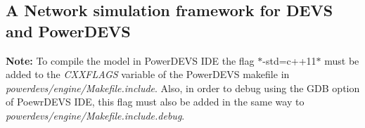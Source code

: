 \subsection*{A Network simulation framework for D\+E\+VS and Power\+D\+E\+VS}

{\bfseries Note\+:} To compile the model in Power\+D\+E\+VS I\+DE the flag $\ast$-\/std=c++11$\ast$ must be added to the {\itshape C\+X\+X\+F\+L\+A\+GS} variable of the Power\+D\+E\+VS makefile in {\itshape powerdevs/engine/\+Makefile.\+include}. Also, in order to debug using the G\+DB option of Poewr\+D\+E\+VS I\+DE, this flag must also be added in the same way to {\itshape powerdevs/engine/\+Makefile.\+include.\+debug}. 